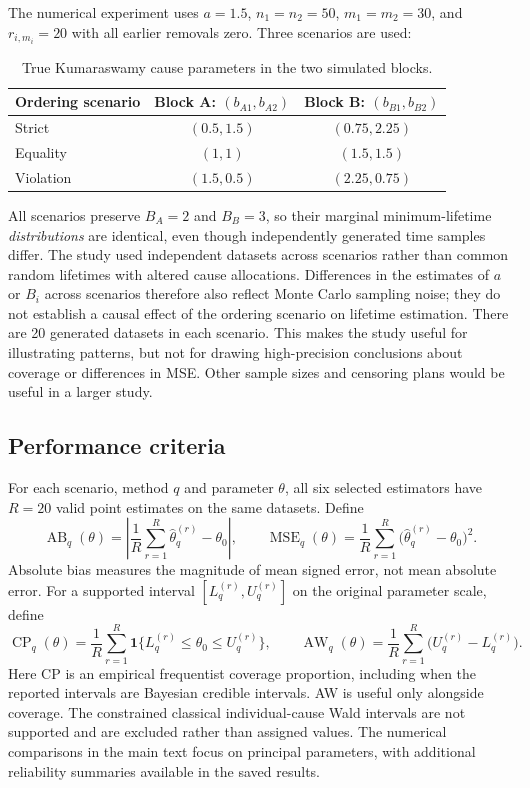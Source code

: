 \documentclass[a4paper,11pt]{article}
\begin{document}
The numerical experiment uses $a=1.5$, $n_1=n_2=50$, $m_1=m_2=30$, and $r_{i,m_i}=20$ with all earlier removals zero. Three scenarios are used:
\begin{table}[htbp]\centering\small
\caption{True Kumaraswamy cause parameters in the two simulated blocks.}\label{tab:scenario-design}
\begin{tabular}{lcc}\toprule
Ordering scenario & Block A: $(b_{A1},b_{A2})$ & Block B: $(b_{B1},b_{B2})$\\\midrule
Strict & $(0.5,1.5)$ & $(0.75,2.25)$\\
Equality & $(1,1)$ & $(1.5,1.5)$\\
Violation & $(1.5,0.5)$ & $(2.25,0.75)$\\\bottomrule
\end{tabular}\end{table}
All scenarios preserve $B_A=2$ and $B_B=3$, so their marginal minimum-lifetime \emph{distributions} are identical, even though independently generated time samples differ. The study used independent datasets across scenarios rather than common random lifetimes with altered cause allocations. Differences in the estimates of $a$ or $B_i$ across scenarios therefore also reflect Monte Carlo sampling noise; they do not establish a causal effect of the ordering scenario on lifetime estimation. There are 20 generated datasets in each scenario. This makes the study useful for illustrating patterns, but not for drawing high-precision conclusions about coverage or differences in MSE. Other sample sizes and censoring plans would be useful in a larger study.

\subsection{Performance criteria}
For each scenario, method $q$ and parameter $\theta$, all six selected estimators have $R=20$ valid point estimates on the same datasets. Define
\begin{equation}\label{eq:simulation-metrics}
\operatorname{AB}_q(\theta)=\left|\frac1R\sum_{r=1}^R\widehat\theta_q^{(r)}-\theta_0\right|,
\qquad
\operatorname{MSE}_q(\theta)=\frac1R\sum_{r=1}^R\bigl(\widehat\theta_q^{(r)}-\theta_0\bigr)^2.
\end{equation}
Absolute bias measures the magnitude of mean signed error, not mean absolute error. For a supported interval $[L_q^{(r)},U_q^{(r)}]$ on the original parameter scale, define
\begin{equation}\label{eq:simulation-intervals}
\operatorname{CP}_q(\theta)=\frac1R\sum_{r=1}^R\mathbf1\{L_q^{(r)}\le\theta_0\le U_q^{(r)}\},\qquad
\operatorname{AW}_q(\theta)=\frac1R\sum_{r=1}^R\bigl(U_q^{(r)}-L_q^{(r)}\bigr).
\end{equation}
Here CP is an empirical frequentist coverage proportion, including when the reported intervals are Bayesian credible intervals. AW is useful only alongside coverage. The constrained classical individual-cause Wald intervals are not supported and are excluded rather than assigned values. The numerical comparisons in the main text focus on principal parameters, with additional reliability summaries available in the saved results.
\end{document}
